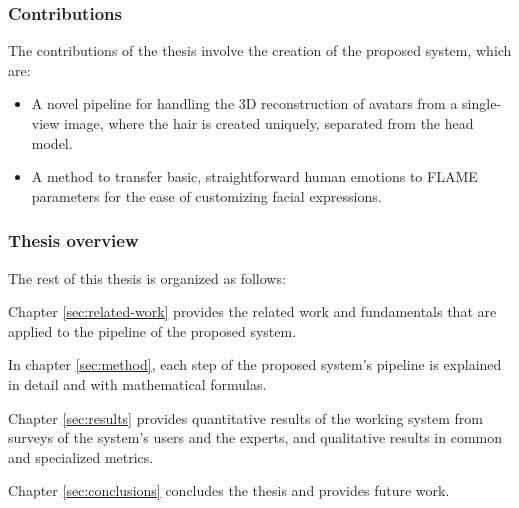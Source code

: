 \subsubsection{Contributions}

The contributions of the thesis involve the creation of the proposed system, which are:

\begin{itemize}
  \item A novel pipeline for handling the 3D reconstruction of avatars from a single-view image, where the hair is created uniquely, separated from the head model.
  \item A method to transfer basic, straightforward human emotions to FLAME parameters for the ease of customizing facial expressions.
\end{itemize}

\subsubsection{Thesis overview}

The rest of this thesis is organized as follows:

Chapter \ref{sec:related-work} provides the related work and fundamentals that are applied to the pipeline of the proposed system.

In chapter \ref{sec:method}, each step of the proposed system's pipeline is explained in detail and with mathematical formulas.

Chapter \ref{sec:results} provides quantitative results of the working system from surveys of the system's users and the experts, and qualitative results in common and specialized metrics.

Chapter \ref{sec:conclusions} concludes the thesis and provides future work.